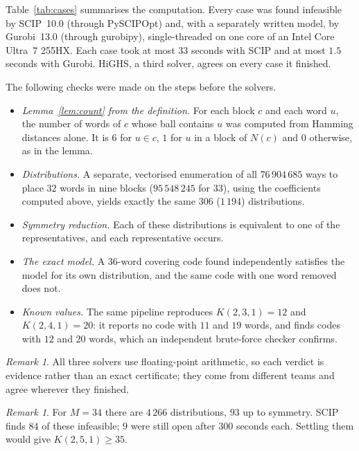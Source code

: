 \documentclass[11pt]{article}
\theoremstyle{remark}
\newtheorem{remark}[theorem]{Remark}
\begin{document}
Table~\ref{tab:cases} summarises the computation. Every case was found infeasible by SCIP~10.0
(through PySCIPOpt) and, with a separately written model, by Gurobi~13.0 (through gurobipy),
single-threaded on one core of an Intel Core Ultra~7 255HX. Each case took at most $33$ seconds
with SCIP and at most $1.5$ seconds with Gurobi. HiGHS, a third solver, agrees on every case it
finished.

The following checks were made on the steps before the solvers.
\begin{itemize}
\item \emph{Lemma~\ref{lem:count} from the definition.} For each block $c$ and each word $u$, the
  number of words of $c$ whose ball contains $u$ was computed from Hamming distances alone. It is
  $6$ for $u\in c$, $1$ for $u$ in a block of $N(c)$ and $0$ otherwise, as in the lemma.
\item \emph{Distributions.} A separate, vectorised enumeration of all $76\,904\,685$ ways to place
  $32$ words in nine blocks ($95\,548\,245$ for $33$), using the coefficients computed above,
  yields exactly the same $306$ ($1\,194$) distributions.
\item \emph{Symmetry reduction.} Each of these distributions is equivalent to one of the
  representatives, and each representative occurs.
\item \emph{The exact model.} A $36$-word covering code found independently satisfies the model
  for its own distribution, and the same code with one word removed does not.
\item \emph{Known values.} The same pipeline reproduces $K(2,3,1)=12$ and $K(2,4,1)=20$: it
  reports no code with $11$ and $19$ words, and finds codes with $12$ and $20$ words, which an
  independent brute-force checker confirms.
\end{itemize}

\begin{remark}
All three solvers use floating-point arithmetic, so each verdict is evidence rather than an
exact certificate; they come from different teams and agree wherever they finished.
\end{remark}

\begin{remark}
For $M=34$ there are $4\,266$ distributions, $93$ up to symmetry. SCIP finds $84$ of these
infeasible; $9$ were still open after $300$ seconds each. Settling them would give
$K(2,5,1)\ge 35$.
\end{remark}
\end{document}
